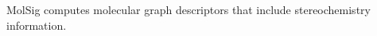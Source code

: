 MolSig \cite{Carbonell_2013} computes molecular graph descriptors that include stereochemistry information.